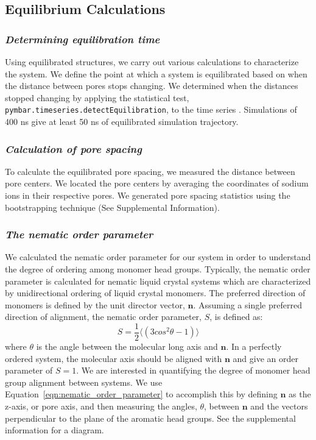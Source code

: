\documentclass[journal=jpcbfk,manusciprt=article]{achemso}
\begin{document}
  \subsection{Equilibrium Calculations}

  \subsubsection{\textit{Determining equilibration time}}

  Using equilibrated structures, we carry out various calculations to
  characterize the system. We define the point at which a system is equilibrated
  based on when the distance between pores stops changing.  We determined when
  the distances stopped changing by applying the statistical test,
  \texttt{pymbar.timeseries.detectEquilibration}, to the time series
  \cite{chodera_simple_2016,shirts_statistically_2008}. Simulations of 400 ns
  give at least 50 ns of equilibrated simulation trajectory.

  \subsubsection{\textit{Calculation of pore spacing}}

  To calculate the equilibrated pore spacing, we measured the distance between
  pore centers. We located the pore centers by averaging the coordinates of sodium
  ions in their respective pores. We generated pore spacing statistics 
  using the bootstrapping technique (See Supplemental Information).

  \subsubsection{\textit{The nematic order parameter}}

  We calculated the nematic order parameter for our system in order to
  understand the degree of ordering among monomer head groups. Typically, the
  nematic order parameter is calculated for nematic liquid crystal systems which
  are characterized by unidirectional ordering of liquid crystal monomers. The
  preferred direction of monomers is defined by the unit director vector,
  $\mathbf{n}$. Assuming a single preferred direction of alignment, the nematic
  order parameter, $S$, is defined as:
  \begin{equation}
	 S = \frac{1}{2} \langle(3cos^2\theta -1)\rangle
	\label{eqn:nematic_order_parameter}
  \end{equation}
  where $\theta$ is the angle between the molecular long axis and $\mathbf{n}$.
  In a perfectly ordered system, the molecular axis should be aligned with
  $\mathbf{n}$ and give an order parameter of $S=1$. We are interested in
  quantifying the degree of monomer head group alignment between systems. We use
  Equation~\ref{eqn:nematic_order_parameter} to accomplish this by defining
  $\mathbf{n}$ as the z-axis, or pore axis, and then measuring the angles,
  $\theta$, between $\mathbf{n}$ and the vectors perpendicular to the plane of
  the aromatic head groups. See the supplemental information for a diagram.  
  
\end{document}
